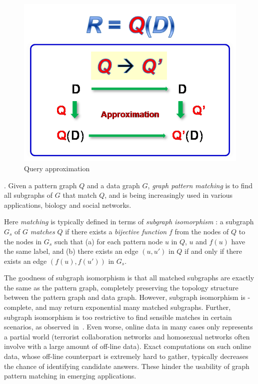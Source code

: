 \begin{figure}[tb!]
  \begin{center}
  \includegraphics[scale=0.45]{./queryApprox.png}
  \caption{Query approximation}\label{fig-tech-queryappro}
  \end{center}
  \vspace{-1ex}
\end{figure}


. Given a pattern graph $Q$ and a data graph $G$,
{\em graph pattern matching} is to find all subgraphs of $G$ that match $Q$, and is being increasingly used in various applications, \eg biology and social networks.


Here {\em matching} is typically defined in terms of
{\em subgraph isomorphism} \cite{Galla06}:
a subgraph $G_s$ of $G$ {\em matches} $Q$ if
there exists a {\em bijective function} $f$
from the nodes of $Q$ to the nodes in $G_s$ such that (a)  for each
pattern node $u$ in $Q$, $u$ and $f(u)$
have the same label,
and (b) there exists an edge $(u, u')$ in $Q$ if and only
if there exists an edge $(f(u), f(u'))$ in $G_s$.


The goodness of subgraph isomorphism is that all matched subgraphs  are exactly the same as the pattern graph, \ie completely preserving the  topology structure between the pattern graph and data graph. However, subgraph isomorphism is \NP-complete, and may return exponential many matched subgraphs.
Further, subgraph isomorphism is too restrictive to find sensible matches in certain scenarios, as observed in~\cite{FanLMTWW10}. Even worse, online data in many cases only represents a partial world (\eg terrorist collaboration networks and homosexual networks often involve with a large amount of off-line data).
Exact computations on such online data, whose off-line counterpart is extremely hard to gather, typically decreases the chance of identifying candidate answers.
These hinder the usability of graph pattern matching in emerging applications.


